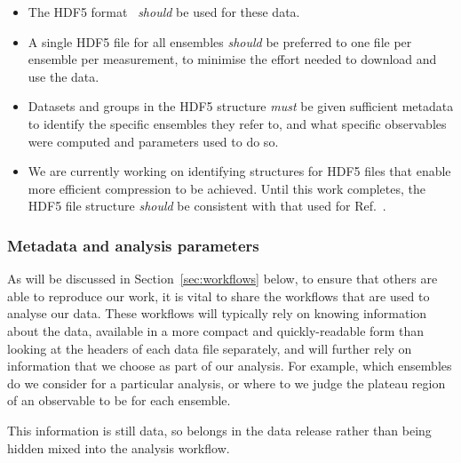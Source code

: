 \documentclass{article}
\newcommand\rfcword[1]{\emph{#1}\xspace}
\newcommand\must{\rfcword{must}}
\newcommand\should{\rfcword{should}}
\begin{document}
\begin{itemize}
  \item
        The HDF5 format~\cite{hdf5} \should be used for these data.
  \item
        A single HDF5 file for all ensembles \should be preferred
        to one file per ensemble per measurement,
        to minimise the effort needed to download and use the data.
  \item
        Datasets and groups in the HDF5 structure \must be given
        sufficient metadata to identify the specific ensembles they refer to,
        and what specific observables were computed and parameters used to do so.
  \item
        We are currently working on identifying
        structures for HDF5 files that enable more efficient compression to be achieved.
        Until this work completes,
        the HDF5 file structure \should be consistent with
        that used for Ref.~\cite{bennett_2024_13819562}.
\end{itemize}


\subsubsection{Metadata and analysis parameters}

As will be discussed in Section~\ref{sec:workflows} below,
to ensure that others are able to reproduce our work,
it is vital to share the workflows that are used to analyse our data.
These workflows will typically rely on knowing information about the data,
available in a more compact and quickly-readable form than
looking at the headers of each data file separately,
and will further rely on information that we choose as part of our analysis.
For example,
which ensembles do we consider for a particular analysis,
or where to we judge the plateau region of an observable to be for each ensemble.

This information is still data,
so belongs in the data release rather than being hidden mixed into the analysis workflow.
\end{document}
